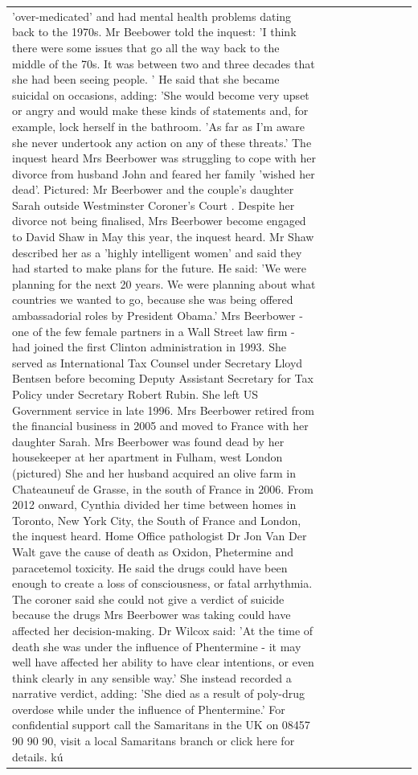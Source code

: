 \begin{table}[H]
\begin{tabular}{lllrlllll}
'over-medicated' and had mental health problems dating back to the 1970s. Mr Beebower told the inquest: 'I think there were some issues that go all the way back to the middle of the 70s. It was between two and three decades that she had been seeing people. ' He said that she became suicidal on occasions, adding: 'She would become very upset or angry and would make these kinds of statements and, for example, lock herself in the bathroom. 'As far as I'm aware she never undertook any action on any of these threats.' The inquest heard Mrs Beerbower was struggling to cope with her divorce from husband John and feared her family 'wished her dead'. Pictured: Mr Beerbower and the couple's daughter Sarah outside Westminster Coroner's Court . Despite her divorce not being finalised, Mrs Beerbower become engaged to David Shaw in May this year, the inquest heard. Mr Shaw described her as a 'highly intelligent women' and said they had started to make plans for the future. He said: 'We were planning for the next 20 years. We were planning about what countries we wanted to go, because she was being offered ambassadorial roles by President Obama.' Mrs Beerbower - one of the few female partners in a Wall Street law firm - had joined the first Clinton administration in 1993. She served as International Tax Counsel under Secretary Lloyd Bentsen before becoming Deputy Assistant Secretary for Tax Policy under Secretary Robert Rubin. She left US Government service in late 1996. Mrs Beerbower retired from the financial business in 2005 and moved to France with her daughter Sarah. Mrs Beerbower was found dead by her housekeeper at her apartment in Fulham, west London (pictured) She and her husband acquired an olive farm in Chateauneuf de Grasse, in the south of France in 2006. From 2012 onward, Cynthia divided her time between homes in Toronto, New York City, the South of France and London, the inquest heard. Home Office pathologist Dr Jon Van Der Walt gave the cause of death as Oxidon, Phetermine and paracetemol toxicity. He said the drugs could have been enough to create a loss of consciousness, or fatal arrhythmia. The coroner said she could not give a verdict of suicide because the drugs Mrs Beerbower was taking could have affected her decision-making. Dr Wilcox said: 'At the time of death she was under the influence of Phentermine - it may well have affected her ability to have clear intentions, or even think clearly in any sensible way.' She instead recorded a narrative verdict, adding: 'She died as a result of poly-drug overdose while under the influence of Phentermine.' For confidential support call the Samaritans in the UK on 08457 90 90 90, visit a local Samaritans branch or click here for details. kú \\

\end{tabular}
\end{table}

